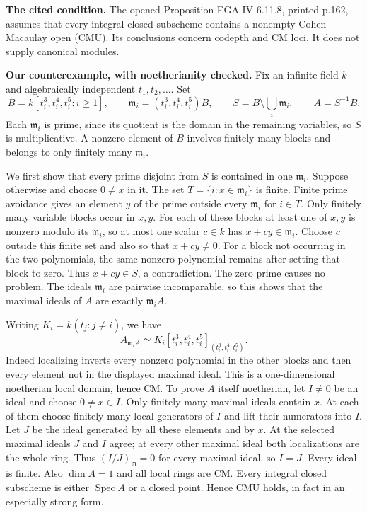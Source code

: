 \textbf{The cited condition.} The opened Proposition EGA IV 6.11.8,
printed p.162, assumes that every integral closed subscheme contains a
nonempty Cohen--Macaulay open (CMU). Its conclusions concern codepth
and CM loci. It does not supply canonical modules.

\textbf{Our counterexample, with noetherianity checked.} Fix an infinite
field $k$ and algebraically independent $t_1,t_2,\ldots$. Set
\[
 B=k[t_i^3,t_i^4,t_i^5:i\geq1],\qquad
 \mathfrak m_i=(t_i^3,t_i^4,t_i^5)B,\qquad
 S=B\setminus\bigcup_i\mathfrak m_i,\qquad A=S^{-1}B.
\]
Each $\mathfrak m_i$ is prime, since its quotient is the domain in
the remaining variables, so $S$ is multiplicative. A nonzero element
of $B$ involves finitely many blocks and belongs to only finitely many
$\mathfrak m_i$.

We first show that every prime disjoint from $S$ is contained in one
$\mathfrak m_i$. Suppose otherwise and choose $0\ne x$ in it. The
set $T=\{i:x\in\mathfrak m_i\}$ is finite. Finite prime avoidance
gives an element $y$ of the prime outside every $\mathfrak m_i$ for
$i\in T$. Only finitely many variable blocks occur in $x,y$.
For each of these blocks at least one of $x,y$ is nonzero modulo its
$\mathfrak m_i$, so at most one scalar $c\in k$ has
$x+cy\in\mathfrak m_i$. Choose $c$ outside this finite set and also
so that $x+cy\ne0$. For a block not occurring in the two polynomials,
the same nonzero polynomial remains after setting that block to zero.
Thus $x+cy\in S$, a contradiction. The zero prime causes no problem.
The ideals $\mathfrak m_i$ are pairwise incomparable, so this shows
that the maximal ideals of $A$ are exactly $\mathfrak m_iA$.

Writing $K_i=k(t_j:j\ne i)$, we have
\[
 A_{\mathfrak m_iA}\simeq
 K_i[t_i^3,t_i^4,t_i^5]_{(t_i^3,t_i^4,t_i^5)}.
\]
Indeed localizing inverts every nonzero polynomial in the other blocks
and then every element not in the displayed maximal ideal. This is a
one-dimensional noetherian local domain, hence CM.
To prove $A$ itself noetherian, let $I\ne0$ be an ideal and choose
$0\ne x\in I$. Only finitely many maximal ideals contain $x$.
At each of them choose finitely many local generators of $I$ and lift
their numerators into $I$. Let $J$ be the ideal generated by all these
elements and by $x$. At the selected maximal ideals $J$ and $I$ agree;
at every other maximal ideal both localizations are the whole ring.
Thus $(I/J)_\mathfrak m=0$ for every maximal ideal, so $I=J$.
Every ideal is finite. Also $\dim A=1$ and all local rings are CM.
Every integral closed subscheme is either $\operatorname{Spec}A$ or
a closed point. Hence CMU holds, in fact in an especially strong form.


